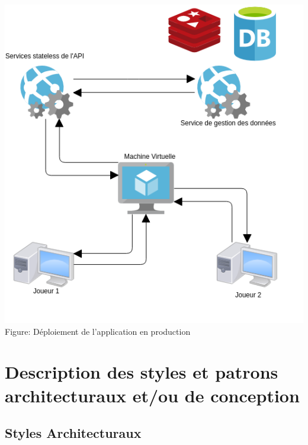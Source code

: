 \documentclass[12pt]{article}
\begin{document}
\begin{center}
\includegraphics[scale = 0.5]{deploiement.png} \\
Figure: Déploiement de l'application en production
\\[1.0 cm]
\end{center}

\section{Description des styles et patrons architecturaux et/ou de conception} 

\subsection{Styles Architecturaux}
\end{document}
